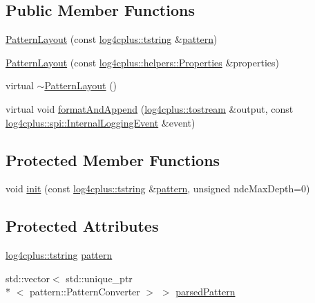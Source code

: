 \subsection*{Public Member Functions}
\begin{DoxyCompactItemize}
\item 
\hyperlink{classlog4cplus_1_1PatternLayout_a8401f1f8c37ed7b4fb74f722a6835ea8}{Pattern\-Layout} (const \hyperlink{namespacelog4cplus_a3c9287f6ebcddc50355e29d71152117b}{log4cplus\-::tstring} \&\hyperlink{classlog4cplus_1_1PatternLayout_a8aa018a29471f32647095e76c6345321}{pattern})
\item 
\hyperlink{classlog4cplus_1_1PatternLayout_acbd699747996053fe231aad7b2d1f2e3}{Pattern\-Layout} (const \hyperlink{classlog4cplus_1_1helpers_1_1Properties}{log4cplus\-::helpers\-::\-Properties} \&properties)
\item 
virtual \hyperlink{classlog4cplus_1_1PatternLayout_ae01900b8048e552fc3558e63c08bcc4b}{$\sim$\-Pattern\-Layout} ()
\item 
virtual void \hyperlink{classlog4cplus_1_1PatternLayout_aa442699685fb1faea7ac05e764a90c8c}{format\-And\-Append} (\hyperlink{namespacelog4cplus_aef9e0c9a1adafed82c39fdef478716e1}{log4cplus\-::tostream} \&output, const \hyperlink{classlog4cplus_1_1spi_1_1InternalLoggingEvent}{log4cplus\-::spi\-::\-Internal\-Logging\-Event} \&event)
\end{DoxyCompactItemize}
\subsection*{Protected Member Functions}
\begin{DoxyCompactItemize}
\item 
void \hyperlink{classlog4cplus_1_1PatternLayout_ada6f1a816c44e1828a1b2fc0b1c3b83f}{init} (const \hyperlink{namespacelog4cplus_a3c9287f6ebcddc50355e29d71152117b}{log4cplus\-::tstring} \&\hyperlink{classlog4cplus_1_1PatternLayout_a8aa018a29471f32647095e76c6345321}{pattern}, unsigned ndc\-Max\-Depth=0)
\end{DoxyCompactItemize}
\subsection*{Protected Attributes}
\begin{DoxyCompactItemize}
\item 
\hyperlink{namespacelog4cplus_a3c9287f6ebcddc50355e29d71152117b}{log4cplus\-::tstring} \hyperlink{classlog4cplus_1_1PatternLayout_a8aa018a29471f32647095e76c6345321}{pattern}
\item 
std\-::vector$<$ std\-::unique\-\_\-ptr\\*
$<$ pattern\-::\-Pattern\-Converter $>$ $>$ \hyperlink{classlog4cplus_1_1PatternLayout_a676c577a96c27492952b9e4dc44097b7}{parsed\-Pattern}
\end{DoxyCompactItemize}


